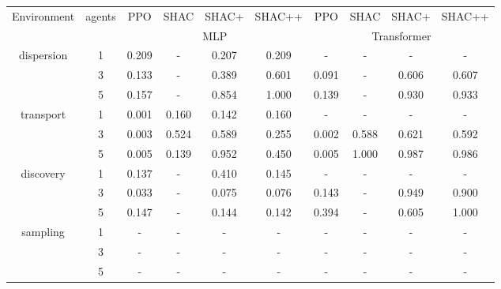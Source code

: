 \begin{tabular}{ c c c c c c c c c c }
\toprule
\multirow{2}{*}{Environment} & \multirow{2}{*}{agents} & PPO & SHAC & SHAC+ & SHAC++ & PPO & SHAC & SHAC+ & SHAC++ \\
 & & \multicolumn{4}{c}{MLP} & \multicolumn{4}{c}{Transformer} \\
\midrule
\multirow{3}{*}{dispersion}& 1 & 0.209 & - & 0.207 & 0.209 & - & - & - & - \\
& 3 & 0.133 & - & 0.389 & 0.601 & 0.091 & - & 0.606 & 0.607 \\
& 5 & 0.157 & - & 0.854 & 1.000 & 0.139 & - & 0.930 & 0.933 \\
\multirow{3}{*}{transport}& 1 & 0.001 & 0.160 & 0.142 & 0.160 & - & - & - & - \\
& 3 & 0.003 & 0.524 & 0.589 & 0.255 & 0.002 & 0.588 & 0.621 & 0.592 \\
& 5 & 0.005 & 0.139 & 0.952 & 0.450 & 0.005 & 1.000 & 0.987 & 0.986 \\
\multirow{3}{*}{discovery}& 1 & 0.137 & - & 0.410 & 0.145 & - & - & - & - \\
& 3 & 0.033 & - & 0.075 & 0.076 & 0.143 & - & 0.949 & 0.900 \\
& 5 & 0.147 & - & 0.144 & 0.142 & 0.394 & - & 0.605 & 1.000 \\
\multirow{3}{*}{sampling}& 1 & - & - & - & - & - & - & - & - \\
& 3 & - & - & - & - & - & - & - & - \\
& 5 & - & - & - & - & - & - & - & - \\
\bottomrule
\end{tabular}
